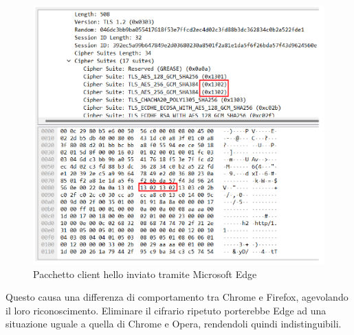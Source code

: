 \begin{figure}[h]
	\includegraphics[width=\textwidth]{figures/cifrario_ripetuto.png}
	\caption{Pacchetto client hello inviato tramite Microsoft Edge}
	\label{cifrario_ripetuto}
\end{figure}

Questo causa una differenza di comportamento tra Chrome e Firefox, agevolando il loro riconoscimento. Eliminare il cifrario ripetuto porterebbe Edge ad una situazione uguale a quella di Chrome e Opera, rendendoli quindi indistinguibili.



 








